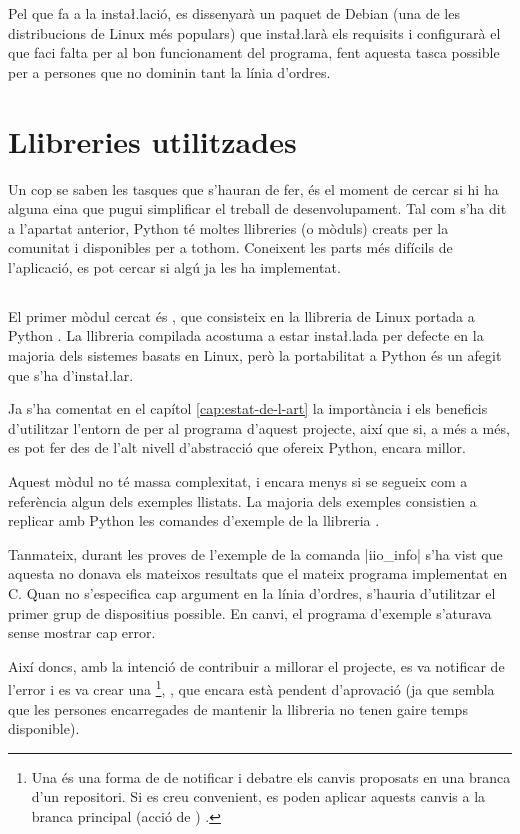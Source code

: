 Pel que fa a la insta\l.lació, es dissenyarà un paquet de Debian (una de les
distribucions de Linux més populars) que insta\l.larà els requisits i configurarà
el que faci falta per al bon funcionament del programa, fent aquesta tasca
possible per a persones que no dominin tant la línia d'ordres.

\section{Llibreries utilitzades}

Un cop se saben les tasques que s'hauran de fer, és el moment de cercar si hi ha
alguna eina que pugui simplificar el treball de desenvolupament. Tal com s'ha dit
a l'apartat anterior, Python té moltes llibreries (o mòduls) creats per la
comunitat i disponibles per a tothom. Coneixent les parts més difícils de
l'aplicació, es pot cercar si algú ja les ha implementat.

\subsection{}

El primer mòdul cercat és , que consisteix en la llibreria de
Linux  portada a Python \cite{Libiio}. La llibreria compilada acostuma
a estar insta\l.lada per defecte en la majoria dels sistemes basats en Linux, però
la portabilitat a Python és un afegit que s'ha d'insta\l.lar.

Ja s'ha comentat en el capítol \ref{cap:estat-de-l-art} la importància
i els beneficis d'utilitzar l'entorn de  per al programa d'aquest projecte,
així que si, a més a més, es pot fer des de l'alt nivell d'abstracció que ofereix
Python, encara millor.

Aquest mòdul no té massa complexitat, i encara menys si se segueix com a referència
algun dels exemples llistats. La majoria dels exemples consistien a replicar
amb Python les comandes d'exemple de la llibreria .

Tanmateix, durant les proves de l'exemple de la comanda \ord|iio_info| s'ha
vist que aquesta no donava els mateixos resultats que el mateix programa implementat
en C. Quan no s'especifica cap argument en la línia d'ordres, s'hauria 
d'utilitzar el primer grup de dispositius possible. En canvi, el programa d'exemple
s'aturava sense mostrar cap error.

Així doncs, amb la intenció de contribuir a millorar el projecte, es va
notificar de l'error i es va crear una 
\footnote{
    Una  és una forma de  de notificar i debatre
    els canvis proposats en una branca d'un repositori. Si es creu convenient,
    es poden aplicar aquests canvis a la branca principal (acció de )
    \cite{PullRequest}.
}, \cite{LibiioPR}, que encara està pendent d'aprovació (ja que sembla que
les persones encarregades de mantenir la llibreria no tenen gaire temps
disponible).

